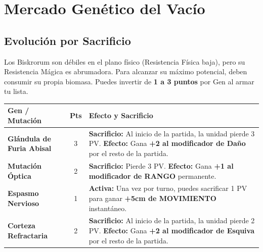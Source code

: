 \chapter{Mercado Genético del Vacío}

\section*{Evolución por Sacrificio}
Los Biskrorum son débiles en el plano físico (Resistencia Física baja), pero su Resistencia Mágica es abrumadora. Para alcanzar su máximo potencial, deben consumir su propia biomasa. Puedes invertir de \textbf{1 a 3 puntos} por Gen al armar tu lista.

\vspace{0.5cm}

\begin{tcolorbox}[enhanced, colback=white, colframe=VoidBlack, title=CATÁLOGO DE MUTACIONES BÁSICAS]
\begin{tabularx}{\linewidth}{l|c|X}
\rowcolor{BloodPurple!20} \textbf{Gen / Mutación} & \textbf{Pts} & \textbf{Efecto y Sacrificio} \\ \hline

\textbf{Glándula de Furia Abisal} & 3 & \textbf{Sacrificio:} Al inicio de la partida, la unidad pierde 3 PV. \textbf{Efecto:} Gana \textbf{+2 al modificador de Daño} por el resto de la partida. \\ \hline

\textbf{Mutación Óptica} & 2 & \textbf{Sacrificio:} Pierde 3 PV. \textbf{Efecto:} Gana \textbf{+1 al modificador de RANGO} permanente. \\ \hline

\textbf{Espasmo Nervioso} & 1 & \textbf{Activa:} Una vez por turno, puedes sacrificar 1 PV para ganar \textbf{+5cm de MOVIMIENTO} instantáneo. \\ \hline

\textbf{Corteza Refractaria} & 2 &\textbf{Sacrificio:} Al inicio de la partida, la unidad pierde 2 PV. \textbf{Efecto:} Gana \textbf{+2 al modificador de Esquiva} por el resto de la partida. \\ \hline
\end{tabularx}
\end{tcolorbox}